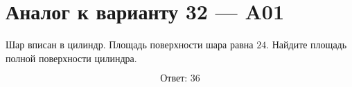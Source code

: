 \documentclass[12pt,a4paper]{article}
\begin{document}
\section*{Аналог к варианту 32 — A01}

Шар вписан в цилиндр. Площадь поверхности шара равна \(24\). Найдите площадь полной поверхности цилиндра.

\begin{center}
\end{center}

\[
\boxed{\text{Ответ: }36}
\]
\end{document}
